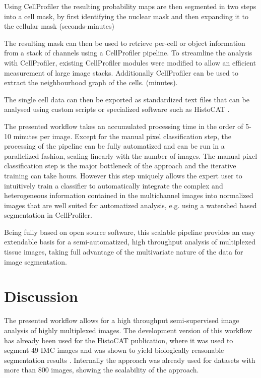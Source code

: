 \documentclass[a4paper]{article}
\begin{document}
Using CellProfiler the resulting probability maps are then segmented in two steps into a cell mask, by first
identifying the nuclear mask and then expanding it to the cellular mask (\texttildelow seconds-minutes)

The resulting mask can then be used to retrieve per-cell or object information from a stack of
channels using a CellProfiler pipeline. To streamline the analysis with CellProfiler, existing
CellProfiler modules were modified to allow an efficient measurement of large image stacks.
Additionally CellProfiler can be used to extract the neighbourhood graph of the cells. (\texttildelow minutes).

The single cell data can then be exported as standardized text files that can be analysed using
custom scripts or specialized software such as HistoCAT \cite{schapiro_histocat:_2017}.

The presented workflow takes an accumulated processing time in the order of 5-10 minutes per image.
Except for the manual pixel classification step, the processing of the pipeline can be fully
automatized and can be run in a parallelized fashion, scaling linearly with the number of images.
The manual pixel classification step is the major bottleneck of the approach and the iterative
training can take hours. However this step uniquely allows the expert user to intuitively  train a classifier to
automatically integrate the complex and heterogeneous information contained in the multichannel images into
normalized images that are well suited for automatized analysis, e.g. using a watershed based
segmentation in CellProfiler.

Being fully based on open source software, this scalable pipeline provides an easy extendable basis
for a semi-automatized, high throughput analysis of multiplexed tissue images, taking full
advantage of the multivariate nature of the data for image segmentation. 

\section{Discussion}

The presented workflow allows for a high throughput semi-supervised image analysis of highly
multiplexed images.  The development version of this workflow has already been used for the HistoCAT
publication, where it was used to segment 49 IMC images and was shown to yield biologically
reasonable segmentation
results \cite{schapiro_histocat:_2017}. Internally the
approach was already used for datasets with more than 800 images, showing the scalability of the
approach.
\end{document}
